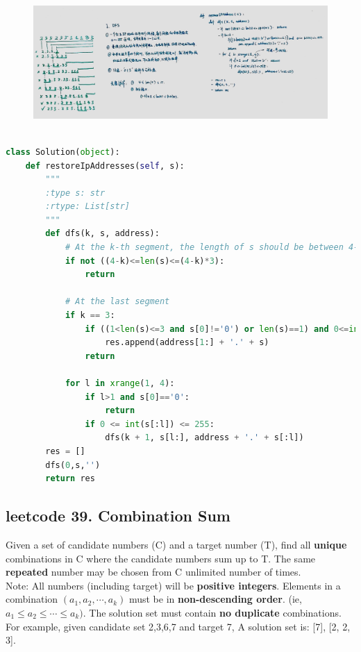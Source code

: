 \documentclass[a4paper,10pt]{article}
\begin{document}
\begin{figure}[h]
    \includegraphics[width=1\textwidth]{leetcode93.jpg}
    \centering\\
\end{figure}

\begin{lstlisting}[language=Python, caption=Problem93. Restore IP Addresses]

class Solution(object):
    def restoreIpAddresses(self, s):
        """
        :type s: str
        :rtype: List[str]
        """
        def dfs(k, s, address):
            # At the k-th segment, the length of s should be between 4-k and (4-k)*3
            if not ((4-k)<=len(s)<=(4-k)*3):
                return

            # At the last segment
            if k == 3:
                if ((1<len(s)<=3 and s[0]!='0') or len(s)==1) and 0<=int(s)<= 255:
                    res.append(address[1:] + '.' + s)
                return

            for l in xrange(1, 4):
                if l>1 and s[0]=='0':
                    return
                if 0 <= int(s[:l]) <= 255:
                    dfs(k + 1, s[l:], address + '.' + s[:l])
        res = []
        dfs(0,s,'')
        return res
\end{lstlisting}


\subsection{leetcode 39. Combination Sum}
Given a set of candidate numbers (C) and a target number (T), find all \textbf{unique} combinations in C where the candidate numbers sum up to T. The same \textbf{repeated} number may be chosen from C unlimited number of times. \\

\noindent Note: All numbers (including target) will be \textbf{positive integers}. Elements in a combination $(a_1, a_2, \cdots , a_k)$ must be in \textbf{non-descending order}. (ie, $a_1 \leq a_2 \leq \cdots \leq a_k)$. The solution set must contain \textbf{no duplicate} combinations. For example, given candidate set 2,3,6,7 and target 7,  A solution set is: [7], [2, 2, 3].
\end{document}
